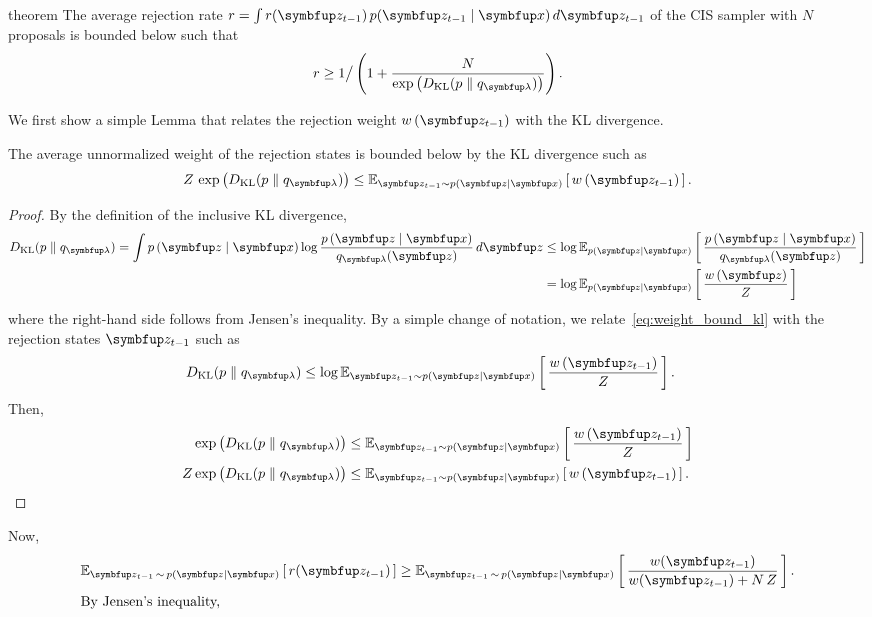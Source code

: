 
\begin{theoremEnd}[]{theorem}\label{thm:cis_bound_kl}
  The average rejection rate \(r = \int r(\vz_{t-1}) \, p(\vz_{t-1}\mid\vx) \, d\vz_{t-1} \) of the CIS sampler with \(N\) proposals is bounded below such that
  \[
  r \geq 1 \big/ 
    \left(1 + \frac{N}{
      \exp\big(\DKL{p}{q_{\vlambda}}\big)
    }
    \right).
  \]
\end{theoremEnd}
\begin{proofEnd}
  We first show a simple Lemma that relates the rejection weight \(w\,(\vz_{t-1})\) with the KL divergence.
  \begin{framedlemma}
    The average unnormalized weight of the rejection states is bounded below by the KL divergence such as
    \[
    Z\,\exp\big(\DKL{p}{q_{\vlambda}}\big) \leq \Esub{\vz_{t-1} \sim p(\vz\mid\vx)}{w\,(\vz_{t-1})}.
    \]
  \begin{proof}
    By the definition of the inclusive KL divergence,
    \begin{align}
      \DKL{p}{q_{\vlambda}} = \int p\,(\vz\mid\vx) \log \frac{p\,(\vz\mid\vx)}{q_{\vlambda}(\vz)} \, d\vz
      &\leq \log \Esub{p(\vz\mid\vx)}{\frac{p\,(\vz\mid\vx)}{q_{\vlambda}(\vz)}} \\
      &= \log \Esub{p(\vz\mid\vx)}{ \frac{w\,(\vz)}{Z} } \label{eq:weight_bound_kl}
    \end{align}
    where the right-hand side follows from Jensen's inequality.
    By a simple change of notation, we relate~\eqref{eq:weight_bound_kl} with the rejection states \(\vz_{t-1}\) such as
    \begin{align}
      \DKL{p}{q_{\vlambda}} &\leq \log \Esub{\vz_{t-1} \sim p(\vz\mid\vx)}{\frac{w\,(\vz_{t-1})}{Z}}.
    \end{align}
    Then,
    \begin{align}
      \exp\big(\DKL{p}{q_{\vlambda}}\big) &\leq \Esub{\vz_{t-1} \sim p(\vz\mid\vx)}{
        \frac{w\,(\vz_{t-1})}{Z}} \\
      Z \exp\big(\DKL{p}{q_{\vlambda}}\big) &\leq \Esub{\vz_{t-1} \sim p(\vz\mid\vx)}{w\,(\vz_{t-1})}.
    \end{align}
  \end{proof}
  \end{framedlemma}
  Now, 
  \begin{align}
    \Esub{\vz_{t-1} \,\sim\, p(\vz\mid\vx)}{ r(\vz_{t-1}) } &\geq \Esub{\vz_{t-1} \,\sim\, p(\vz\mid\vx)}{ \frac{w(\vz_{t-1})}{w(\vz_{t-1}) + N\,Z}}. \\
\intertext{By Jensen's inequality,}

\end{align}
\end{proofEnd}
